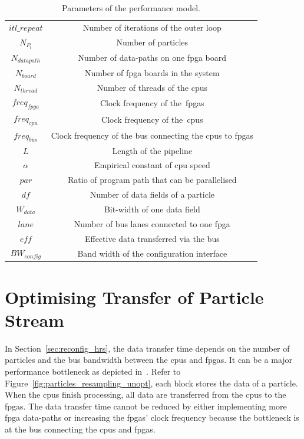 \begin{table}
	\setlength{\tabcolsep}{3pt}
	\begin{spacing}{1.0}
	\caption{Parameters of the performance model.}
	\label{tab:reconfig_parameters_adaptation}
	\footnotesize
	\centering
	\smallskip
		\begin{tabular}{c|c}
			\hline
			$itl\_{repeat}$ & Number of iterations of the outer loop \\
			$N_{P_t}$ & Number of particles \\
			$N_{datapath}$ & Number of data-paths on one \gls{fpga} board \\
			$N_{board}$ & Number of \gls{fpga} boards in the system \\
			$N_{thread}$ & Number of threads of the \glspl{cpu} \\
			$\mathit{freq}_{fpga}$ & Clock frequency of the~\glspl{fpga} \\
			$\mathit{freq}_{cpu}$ & Clock frequency of the~\glspl{cpu} \\
			$\mathit{freq}_{bus}$ & Clock frequency of the bus connecting the \glspl{cpu} to \glspl{fpga} \\
			$L$ & Length of the pipeline \\
			$\alpha$ & Empirical constant of \gls{cpu} speed \\
			$par$ & Ratio of program path that can be parallelised \\
			$df$ & Number of data fields of a particle \\
			$W_{data}$ & Bit-width of one data field \\
			$\mathit{lane}$ & Number of bus lanes connected to one \gls{fpga} \\
			$\mathit{eff}$ & Effective data transferred via the bus \\
			$BW_{config}$ & Band width of the configuration interface \\
			\hline
		\end{tabular}
		\end{spacing}
\end{table}

\section{Optimising Transfer of Particle Stream}
\label{sec:reconfig_stream}

In Section~\ref{sec:reconfig_hrs}, the data transfer time depends on the number of particles and the bus bandwidth between the \glspl{cpu} and \glspl{fpga}.
It can be a major performance bottleneck as depicted in~\cite{chau13arc}.
Refer to Figure~\ref{fig:particles_resampling_unopt}, each block stores the data of a particle.
When the \glspl{cpu} finish processing, all data are transferred from the \glspl{cpu} to the \glspl{fpga}.
The data transfer time cannot be reduced by either implementing more \gls{fpga} data-paths or increasing the \glspl{fpga}' clock frequency because the bottleneck is at the bus connecting the \glspl{cpu} and \glspl{fpga}.

